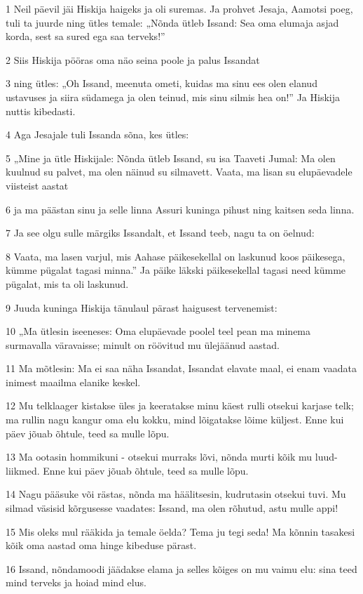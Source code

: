 \par 1 Neil päevil jäi Hiskija haigeks ja oli suremas. Ja prohvet Jesaja, Aamotsi poeg, tuli ta juurde ning ütles temale: „Nõnda ütleb Issand: Sea oma elumaja asjad korda, sest sa sured ega saa terveks!”
\par 2 Siis Hiskija pööras oma näo seina poole ja palus Issandat
\par 3 ning ütles: „Oh Issand, meenuta ometi, kuidas ma sinu ees olen elanud ustavuses ja siira südamega ja olen teinud, mis sinu silmis hea on!” Ja Hiskija nuttis kibedasti.
\par 4 Aga Jesajale tuli Issanda sõna, kes ütles:
\par 5 „Mine ja ütle Hiskijale: Nõnda ütleb Issand, su isa Taaveti Jumal: Ma olen kuulnud su palvet, ma olen näinud su silmavett. Vaata, ma lisan su elupäevadele viisteist aastat
\par 6 ja ma päästan sinu ja selle linna Assuri kuninga pihust ning kaitsen seda linna.
\par 7 Ja see olgu sulle märgiks Issandalt, et Issand teeb, nagu ta on öelnud:
\par 8 Vaata, ma lasen varjul, mis Aahase päikesekellal on laskunud koos päikesega, kümme pügalat tagasi minna.” Ja päike läkski päikesekellal tagasi need kümme pügalat, mis ta oli laskunud.
\par 9 Juuda kuninga Hiskija tänulaul pärast haigusest tervenemist:
\par 10 „Ma ütlesin iseeneses: Oma elupäevade poolel teel pean ma minema surmavalla väravaisse; minult on röövitud mu ülejäänud aastad.
\par 11 Ma mõtlesin: Ma ei saa näha Issandat, Issandat elavate maal, ei enam vaadata inimest maailma elanike keskel.
\par 12 Mu telklaager kistakse üles ja keeratakse minu käest rulli otsekui karjase telk; ma rullin nagu kangur oma elu kokku, mind lõigatakse lõime küljest. Enne kui päev jõuab õhtule, teed sa mulle lõpu.
\par 13 Ma ootasin hommikuni - otsekui murraks lõvi, nõnda murti kõik mu luud-liikmed. Enne kui päev jõuab õhtule, teed sa mulle lõpu.
\par 14 Nagu pääsuke või rästas, nõnda ma häälitsesin, kudrutasin otsekui tuvi. Mu silmad väsisid kõrgusesse vaadates: Issand, ma olen rõhutud, astu mulle appi!
\par 15 Mis oleks mul rääkida ja temale öelda? Tema ju tegi seda! Ma kõnnin tasakesi kõik oma aastad oma hinge kibeduse pärast.
\par 16 Issand, nõndamoodi jäädakse elama ja selles kõiges on mu vaimu elu: sina teed mind terveks ja hoiad mind elus.
